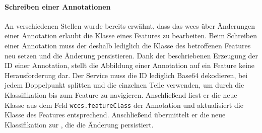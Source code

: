     \paragraph{Schreiben einer Annotationen}
    An verschiedenen Stellen wurde bereits erwähnt,
    dass das \gls{wccs} über Änderungen einer Annotation erlaubt die Klasse eines Features zu bearbeiten.
    Beim Schreiben einer Annotation muss der {\annotationService} deshalb lediglich
    die Klasse des betroffenen Features neu setzen und die Änderung persistieren.
    Dank der beschriebenen Erzeugung der ID einer Annotation,
    stellt die Abbildung einer Annotation auf ein Feature keine Herausforderung dar.
    Der Service muss die ID lediglich Base64 dekodieren,
    bei jedem Doppelpunkt splitten und die einzelnen Teile verwenden,
    um durch die Klassifikation bis zum Feature zu navigieren.
    Anschließend liest er die neue Klasse aus dem Feld \texttt{wccs.featureClass} der Annotation
    und aktualisiert die Klasse des Features entsprechend.
    Anschließend übermittelt er die neue Klassifikation zur {\classificationStorageAPI},
    die die Änderung persistiert.
